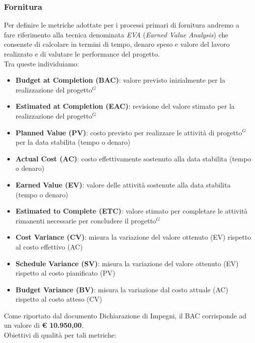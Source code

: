 \documentclass[a4paper,10pt]{article}
\begin{document}
\subsubsection{Fornitura}
Per definire le metriche adottate per i processi primari di fornitura andremo a fare riferimento alla tecnica denominata \textit{EVA} (\textit{Earned Value Analysis}) che consenste di calcolare in termini di tempo, denaro speso e valore del lavoro realizzato e di valutare le performance del progetto.\\ Tra queste individuiamo:
\begin{itemize}
    \item \textbf{Budget at Completion (BAC)}: valore previsto inizialmente per la realizzazione del progetto$^G$
    \item \textbf{Estimated at Completion (EAC)}: revisione del valore stimato per la realizzazione del progetto$^G$
    \item \textbf{Planned Value (PV)}: costo previsto per realizzare le attività di progetto$^G$ per la data stabilita (tempo o denaro)
    \item \textbf{Actual Cost (AC)}: costo effettivamente sostenuto alla data stabilita (tempo o denaro)
    \item \textbf{Earned Value (EV)}: valore delle attività sostenute alla data stabilita (tempo o denaro)
    \item \textbf{Estimated to Complete (ETC)}: valore stimato per completare le attività rimanenti necessarie per concludere il progetto$^G$
    \item \textbf{Cost Variance (CV)}: misura la variazione del valore ottenuto (EV) rispetto al costo effettivo (AC)
    \item \textbf{Schedule Variance (SV)}: misura la variazione del valore ottenuto (EV) rispetto al costo pianificato (PV)
    \item \textbf{Budget Variance (BV)}: misura la variazione dal costo attuale (AC) rispetto al costo atteso (CV)
\end{itemize}
Come riportato dal documento Dichiarazione di Impegni, il BAC corrisponde ad un valore di \textbf{€ 10.950,00}.
\\
Obiettivi di qualità per tali metriche: 
\end{document}
